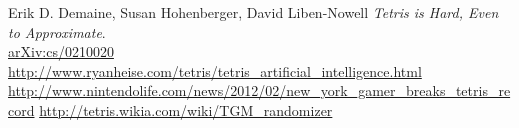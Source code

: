 \documentclass[fontsize=12pt]{article}
\begin{document}
\newpage


\begin{thebibliography}{9}
Erik D. Demaine, Susan Hohenberger, David Liben-Nowell
\textit{
Tetris is Hard, Even to Approximate}.
\\\href{https://arxiv.org/abs/cs/0210020}{arXiv:cs/0210020}
  \url{http://www.ryanheise.com/tetris/tetris_artificial_intelligence.html}
  \url{http://www.nintendolife.com/news/2012/02/new_york_gamer_breaks_tetris_record}
  \url{http://tetris.wikia.com/wiki/TGM_randomizer}
\end{thebibliography}
\end{document}
